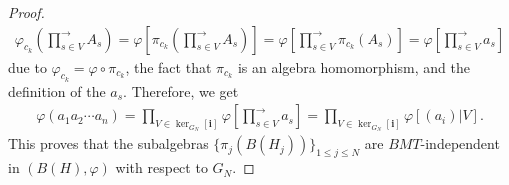 \documentclass[a4paper,12pt]{extarticle}
\theoremstyle{definition}
\theoremstyle{remark}
\begin{document}
\begin{proof}
\begin{align*}
		\varphi_{c_k}\left(\prod_{s\in V}^{\rightarrow } A_s\right)=\varphi\left[\pi_{c_k}\left(\prod_{s\in V}^{\rightarrow } A_s\right)\right]=  \varphi\left[\prod_{s\in V}^{\rightarrow } \pi_{c_k}\left(A_s\right)\right]= \varphi\left[\prod_{s\in V}^{\rightarrow } a_s\right]
	\end{align*}
	due to $\varphi_{c_k}=\varphi \circ \pi_{c_k}$, the fact that $\pi_{c_k}$ is an algebra homomorphism, and the definition of the $a_s$. 
	Therefore, we get
	\begin{align*}
		\varphi(a_1a_2\cdots a_n)=\prod_{V\in \ker_{G_N}[\bm{i}]}\varphi\left[\prod_{s\in V}^{\rightarrow } a_s\right]=\prod_{V\in \ker_{G_N}[\bm{i}]} \varphi\left[(a_i)|V\right].
	\end{align*}
	This proves that the subalgebras $\{\pi_j(B(H_j))\}_{1\leq j \leq N}$ are $BMT$-independent in $(B(H),\varphi)$ with respect to $G_N$.
\end{proof}
\end{document}

